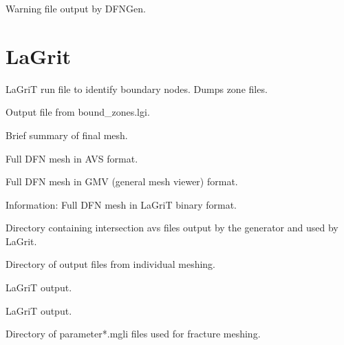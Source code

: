 \documentclass[letterpaper,10pt,english]{sphinxmanual}
\begin{document}
\label{\detokenize{output:warningfiledfngen-txt}}
Warning file output by DFNGen.


\section{LaGrit}
\label{\detokenize{output:id2}}

\label{\detokenize{output:bound-zones-lgi}}
LaGriT run file to identify boundary nodes. Dumps zone files.


\label{\detokenize{output:boundary-output-txt}}
Output file from bound\_zones.lgi.


\label{\detokenize{output:finalmesh-txt}}
Brief summary of final mesh.


\label{\detokenize{output:full-mesh-inp}}
Full DFN mesh in AVS format.


\label{\detokenize{output:full-mesh-gmv}}
Full DFN mesh in GMV (general mesh viewer) format.


\label{\detokenize{output:full-mesh-lg}}
Information: Full DFN mesh in LaGriT binary format.


\label{\detokenize{output:intersections}}
Directory containing intersection avs files output by the generator and used by LaGrit.


\label{\detokenize{output:lagrit-logs}}
Directory of output files from individual meshing.


\label{\detokenize{output:logx3dgen}}
LaGriT output.


\label{\detokenize{output:outx3dgen}}
LaGriT output.


\label{\detokenize{output:parameters}}
Directory of parameter*.mgli files used for fracture meshing.
\end{document}
